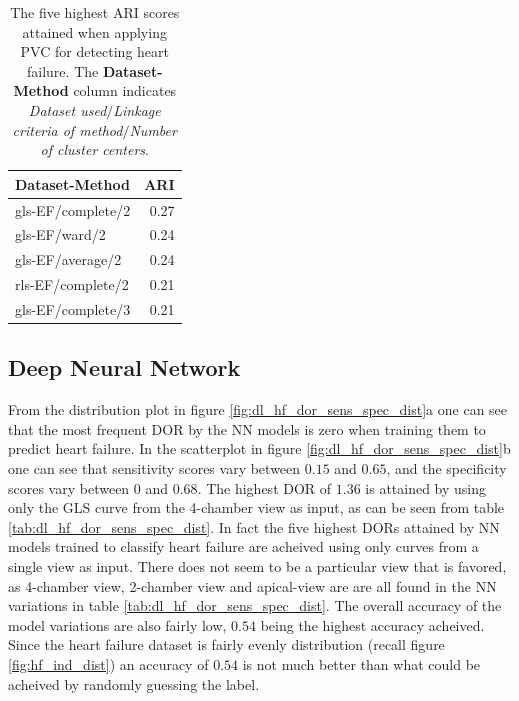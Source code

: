 \begin{table}[htb]
    \centering
    \begin{tabular}{lr}
        \toprule
        Dataset-Method    &  ARI \\
        \midrule
        gls-EF/complete/2 & 0.27 \\
        gls-EF/ward/2     & 0.24 \\
        gls-EF/average/2  & 0.24 \\
        rls-EF/complete/2 & 0.21 \\
        gls-EF/complete/3 & 0.21 \\
        \bottomrule
    \end{tabular}
    \caption{The five highest ARI scores attained when applying PVC for detecting heart failure.
             The \textbf{Dataset-Method} column indicates \textit{Dataset used}$/$\textit{Linkage criteria of method}$/$\textit{Number of cluster centers}.}
    \label{tab:pvc_hf_ari}
\end{table}

\newpage 

\subsection{Deep Neural Network}

From the distribution plot in figure \ref{fig:dl_hf_dor_sens_spec_dist}a one can see that the most frequent DOR by the NN models is zero when training them to predict heart failure.
In the scatterplot in figure \ref{fig:dl_hf_dor_sens_spec_dist}b one can see that sensitivity scores vary between $0.15$ and $0.65$, and the specificity scores vary between $0$ and $0.68$.
The highest DOR of $1.36$ is attained by using only the GLS curve from the 4-chamber view as input, as can be seen from table \ref{tab:dl_hf_dor_sens_spec_dist}.
In fact the five highest DORs attained by NN models trained to classify heart failure are acheived using only curves from a single view as input.
There does not seem to be a particular view that is favored, as 4-chamber view, 2-chamber view and apical-view are are all found in the NN variations in table \ref{tab:dl_hf_dor_sens_spec_dist}.
The overall accuracy of the model variations are also fairly low, $0.54$ being the highest accuracy acheived.
Since the heart failure dataset is fairly evenly distribution (recall figure \ref{fig:hf_ind_dist}) an accuracy of $0.54$ is not much better than what could be acheived 
by randomly guessing the label.

